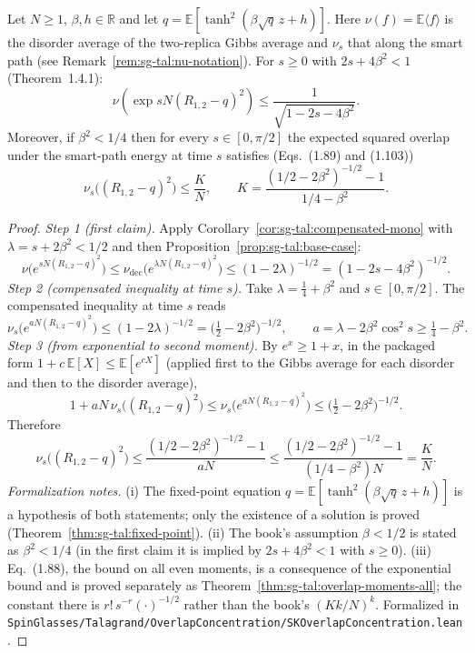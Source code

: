 \begin{theorem}\label{thm:sg-tal:overlap-conc}
  \leanok
{}
Let $N\ge1$, $\beta,h\in\mathbb R$ and let $q=\mathbb{E}[\tanh^2(\beta\sqrt q\,z+h)]$. Here $\nu(f)=\mathbb{E}\langle f\rangle$ is the disorder average of the two-replica Gibbs average and $\nu_s$ that along the smart path (see Remark~\ref{rem:sg-tal:nu-notation}).
For $s\ge0$ with $2s+4\beta^2<1$ (Theorem~1.4.1):
\[
\nu\left(\exp s N (R_{1,2} - q)^2\right) \le \frac{1}{\sqrt{1 - 2s - 4\beta^2}} .
\]
Moreover, if $\beta^2<1/4$ then for every $s\in[0,\pi/2]$ the expected squared overlap under the smart-path energy at time $s$ satisfies (Eqs.~(1.89) and (1.103))
\[
\nu_s\big((R_{1,2}-q)^2\big)\le \frac{K}{N},\qquad K=\frac{(1/2-2\beta^2)^{-1/2}-1}{1/4-\beta^2}.
\]
\end{theorem}
\begin{proof}
\leanok
\emph{Step 1 (first claim).} Apply Corollary~\ref{cor:sg-tal:compensated-mono} with $\lambda=s+2\beta^2<1/2$ and then Proposition~\ref{prop:sg-tal:base-case}:
\[
\nu\big(e^{sN(R_{1,2}-q)^2}\big)\le\nu_{\mathrm{dec}}\big(e^{\lambda N(R_{1,2}-q)^2}\big)\le(1-2\lambda)^{-1/2}=(1-2s-4\beta^2)^{-1/2}.
\]
\emph{Step 2 (compensated inequality at time $s$).} Take $\lambda=\frac14+\beta^2$ and $s\in[0,\pi/2]$. The compensated inequality at time $s$ reads
\[
\nu_s\big(e^{aN(R_{1,2}-q)^2}\big)\le(1-2\lambda)^{-1/2}=\Big(\tfrac12-2\beta^2\Big)^{-1/2},\qquad a=\lambda-2\beta^2\cos^2s\ge\tfrac14-\beta^2 .
\]
\emph{Step 3 (from exponential to second moment).} By $e^x\ge1+x$, in the packaged form $1+c\,\mathbb{E}[X]\le\mathbb{E}[e^{cX}]$ (applied first to the Gibbs average for each disorder and then to the disorder average),
\[
1+aN\,\nu_s\big((R_{1,2}-q)^2\big)\le\nu_s\big(e^{aN(R_{1,2}-q)^2}\big)\le\Big(\tfrac12-2\beta^2\Big)^{-1/2}.
\]
Therefore
\[
\nu_s\big((R_{1,2}-q)^2\big)\le\frac{(1/2-2\beta^2)^{-1/2}-1}{aN}\le\frac{(1/2-2\beta^2)^{-1/2}-1}{(1/4-\beta^2)N}=\frac KN .
\]
\emph{Formalization notes.} (i) The fixed-point equation $q=\mathbb{E}[\tanh^2(\beta\sqrt q\,z+h)]$ is a hypothesis of both statements; only the existence of a solution is proved (Theorem~\ref{thm:sg-tal:fixed-point}).
(ii) The book's assumption $\beta<1/2$ is stated as $\beta^2<1/4$ (in the first claim it is implied by $2s+4\beta^2<1$ with $s\ge0$).
(iii) Eq.~(1.88), the bound on all even moments, is a consequence of the exponential bound and is proved separately as Theorem~\ref{thm:sg-tal:overlap-moments-all}; the constant there is $r!\,s^{-r}(\cdot)^{-1/2}$ rather than the book's $(Kk/N)^k$.
Formalized in \texttt{SpinGlasses/Talagrand/OverlapConcentration/SKOverlapConcentration.lean}.
\end{proof}

